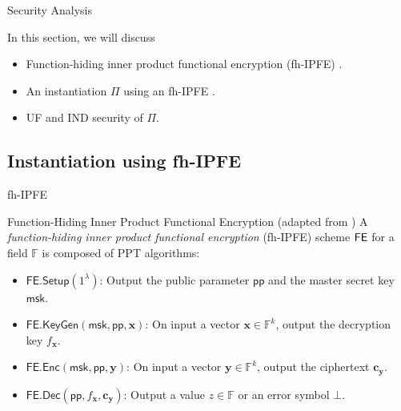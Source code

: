 
\begin{frame}{Security Analysis}

In this section, we will discuss

\begin{itemize}

	\item<2-> Function-hiding inner product functional encryption (fh-IPFE) \cite{cryptoeprint:2016/440}.

	\item<3-> An instantiation $\Pi$ using an fh-IPFE \cite{cryptoeprint:2023/481}.

	\item<4-> UF and IND security of $\Pi$.

\end{itemize}


\end{frame}


\subsection{Instantiation using fh-IPFE}


\begin{frame}{fh-IPFE}

\begin{definition}{Function-Hiding Inner Product Functional Encryption (adapted from \cite{cryptoeprint:2016/440})}
	A \emph{function-hiding inner product functional encryption} (fh-IPFE) scheme $\sf FE$ for a field $\mathbb{F}$ is composed of PPT algorithms:
	\begin{itemize}
	
		\item<2-> $\textsf{FE.Setup}(1^\lambda)$: Output the public parameter $\textsf{pp}$ and the master secret key $\textsf{msk}$.
	
		\item<3-> $\textsf{FE.KeyGen}(\textsf{msk}, \textsf{pp}, \mathbf{x})$: On input a vector $\mathbf{x} \in \mathbb{F}^k$, output the decryption key $f_\mathbf{x}$.  
	
		\item<4-> $\textsf{FE.Enc}(\textsf{msk}, \textsf{pp}, \mathbf{y})$: On input a vector $\mathbf{y} \in \mathbb{F}^k$, output the ciphertext $\mathbf{c_y}$. 
	
		\item<5-> $\textsf{FE.Dec}(\textsf{pp}, f_\mathbf{x}, \mathbf{c_y})$: Output a value $z \in \mathbb{F}$ or an error symbol $\bot$.
	
	\end{itemize}
	

\end{definition}

\end{frame}


